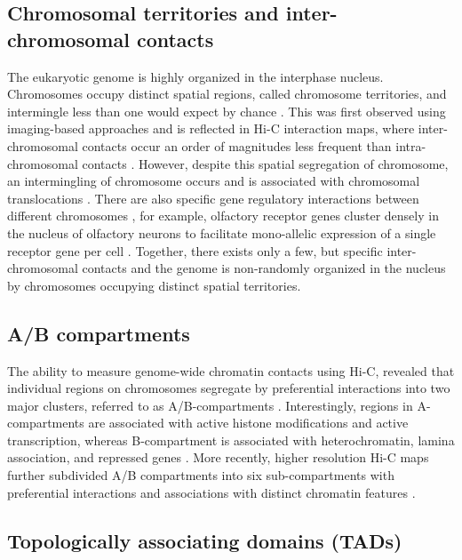 \documentclass[a4paper,twoside=true,openright,parskip=full,chapterprefix=true,11pt,headings=normal,bibliography=totoc,listof=totoc,titlepage=on,captions=tableabove,draft=false]{scrreprt}
\theoremstyle{definition}
\theoremstyle{definition}
\theoremstyle{definition}
\theoremstyle{remark}
\begin{document}
\hypertarget{chromosomal-territories-and-inter-chromosomal-contacts}{%
\subsection{Chromosomal territories and inter-chromosomal
contacts}\label{chromosomal-territories-and-inter-chromosomal-contacts}}

The eukaryotic genome is highly organized in the interphase nucleus.
Chromosomes occupy distinct spatial regions, called chromosome
territories, and intermingle less than one would expect by chance
\citep{Cremer2001}. This was first observed using imaging-based
approaches and is reflected in Hi-C interaction maps, where
inter-chromosomal contacts occur an order of magnitudes less frequent
than intra-chromosomal contacts \citep{Lieberman-Aiden2009}. However,
despite this spatial segregation of chromosome, an intermingling of
chromosome occurs and is associated with chromosomal translocations
\citep{Branco2006, Roukos2013, Roukos2014}. There are also specific gene
regulatory interactions between different chromosomes
\citep{DeLaat2007}, for example, olfactory receptor genes cluster
densely in the nucleus of olfactory neurons to facilitate mono-allelic
expression of a single receptor gene per cell \citep{Monahan2015}.
Together, there exists only a few, but specific inter-chromosomal
contacts and the genome is non-randomly organized in the nucleus by
chromosomes occupying distinct spatial territories.

\hypertarget{ab-compartments}{%
\subsection{A/B compartments}\label{ab-compartments}}

The ability to measure genome-wide chromatin contacts using Hi-C,
revealed that individual regions on chromosomes segregate by
preferential interactions into two major clusters, referred to as
A/B-compartments \citep{Lieberman-Aiden2009}. Interestingly, regions in
A-compartments are associated with active histone modifications and
active transcription, whereas B-compartment is associated with
heterochromatin, lamina association, and repressed genes
\citep{Bonev2016}. More recently, higher resolution Hi-C maps further
subdivided A/B compartments into six sub-compartments with preferential
interactions and associations with distinct chromatin features
\citep{Rao2014}.

\hypertarget{topologically-associating-domains-tads}{%
\subsection{Topologically associating domains
(TADs)}\label{topologically-associating-domains-tads}}
\end{document}
